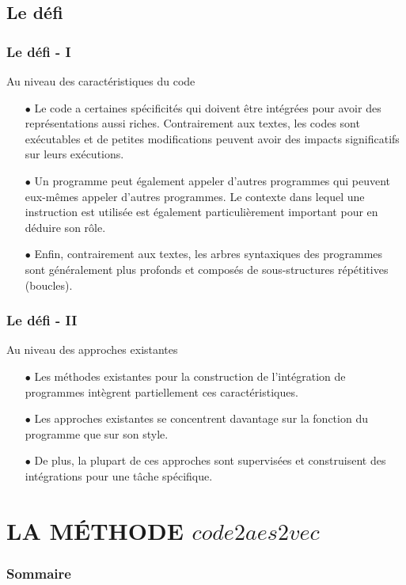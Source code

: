 \documentclass[xcolor=dvipsnames]{beamer}
\begin{document}
\subsection{Le défi}
\begin{frame}
\frametitle{Le défi - I}
\begin{block}{Au niveau des caractéristiques du code}
\begin{itemize}
\item[$\bullet$] Le code a certaines spécificités qui doivent être intégrées pour avoir des représentations aussi riches. Contrairement aux textes, les codes sont exécutables et de petites modifications peuvent avoir des impacts significatifs sur leurs exécutions.

\item[$\bullet$] Un programme peut également appeler d'autres programmes qui peuvent eux-mêmes appeler d'autres programmes. Le contexte dans lequel une instruction est utilisée est également particulièrement important pour en déduire son rôle.

\item[$\bullet$] Enfin, contrairement aux textes, les arbres syntaxiques des programmes sont généralement plus profonds et composés de sous-structures répétitives (boucles).
\end{itemize}
\end{block}
\end{frame}

\begin{frame}
\frametitle{Le défi - II}
\begin{block}{Au niveau des approches existantes}
\begin{itemize}
\item[$\bullet$] Les méthodes existantes pour la construction de l’intégration de programmes intègrent partiellement ces caractéristiques.

\item[$\bullet$] Les approches existantes se concentrent davantage sur la fonction du programme que sur son style.

\item[$\bullet$] De plus, la plupart de ces approches sont supervisées et construisent des intégrations pour une tâche spécifique.
\end{itemize}
\end{block}
\end{frame}

\section{LA MÉTHODE $code2aes2vec$}
\begin{frame}
\frametitle{Sommaire}
\tableofcontents[currentsection]
\end{frame}
\end{document}
